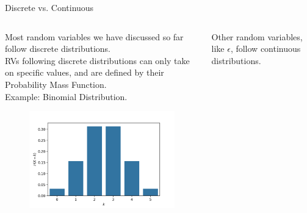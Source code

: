 \documentclass[aspectratio=169]{../latex_main/tntbeamer}  %
\begin{document}
	
	\begin{frame}{Discrete vs. Continuous}
	    \begin{columns}
	        \begin{column}{.4\textwidth}
	               Most random variables we have discussed so far follow discrete distributions.\\

	               RVs following discrete distributions can only take on specific values, and are defined by their Probability Mass Function.\\

	               Example: Binomial Distribution.
                    \begin{figure}
                        \includegraphics[scale=.5]{Bild4}
                    \end{figure}
	        \end{column}
	        
	        
	        \begin{column}{.4\textwidth}
	            Other random variables, like $\epsilon$, follow continuous distributions.\\


\end{column}
\end{columns}
\end{frame}
\end{document}
